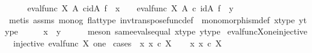 \begin{isabellebody}
\ \ \isamarkupfalse%
\ \isamarkupfalse%
\ {\isachardoublequoteopen}eval{\isacharunderscore}{\kern0pt}func\ X\ A\ {\isasymcirc}\isactrlsub c{\isacharparenleft}{\kern0pt}id{\isacharparenleft}{\kern0pt}A{\isacharparenright}{\kern0pt}\ {\isasymtimes}\isactrlsub f\ \ x{\isacharparenright}{\kern0pt}\ {\isacharequal}{\kern0pt}\ \ \ eval{\isacharunderscore}{\kern0pt}func\ X\ A\ {\isasymcirc}\isactrlsub c\ {\isacharparenleft}{\kern0pt}id{\isacharparenleft}{\kern0pt}A{\isacharparenright}{\kern0pt}\ {\isasymtimes}\isactrlsub f\ \ y{\isacharparenright}{\kern0pt}{\isachardoublequoteclose}\ \ \isanewline
\ \ \ \ \isamarkupfalse%
\ {\isacharparenleft}{\kern0pt}metis\ assms{\isacharparenleft}{\kern0pt}{}{\isacharparenright}{\kern0pt}\ mono{\isacharunderscore}{\kern0pt}g\ flat{\isacharunderscore}{\kern0pt}type\ inv{\isacharunderscore}{\kern0pt}transpose{\isacharunderscore}{\kern0pt}func{\isacharunderscore}{\kern0pt}def{}\ \ monomorphism{\isacharunderscore}{\kern0pt}def{}\ x{\isacharunderscore}{\kern0pt}type{\isacharprime}{\kern0pt}\ y{\isacharunderscore}{\kern0pt}type{\isacharprime}{\kern0pt}{\isacharparenright}{\kern0pt}\isanewline
\ \ \isamarkupfalse%
\ \isamarkupfalse%
\ {\isachardoublequoteopen}x\ {\isacharequal}{\kern0pt}\ y{\isachardoublequoteclose}\isanewline
\ \ \ \ \isamarkupfalse%
\ {\isacharparenleft}{\kern0pt}meson\ same{\isacharunderscore}{\kern0pt}evals{\isacharunderscore}{\kern0pt}equal\ x{\isacharunderscore}{\kern0pt}type{\isacharprime}{\kern0pt}\ y{\isacharunderscore}{\kern0pt}type{\isacharprime}{\kern0pt}{\isacharparenright}{\kern0pt}\isanewline
{}\isamarkupfalse%
%
\endisatagproof
{\isafoldproof}%
%
\isadelimproof
\isanewline
%
\endisadelimproof
\isanewline
{}\isamarkupfalse%
\ eval{\isacharunderscore}{\kern0pt}func{\isacharunderscore}{\kern0pt}X{\isacharunderscore}{\kern0pt}one{\isacharunderscore}{\kern0pt}injective{\isacharcolon}{\kern0pt}\isanewline
\ \ {\isachardoublequoteopen}injective\ {\isacharparenleft}{\kern0pt}eval{\isacharunderscore}{\kern0pt}func\ X\ one{\isacharparenright}{\kern0pt}{\isachardoublequoteclose}\isanewline
%
\isadelimproof
%
\endisadelimproof
%
\isatagproof
{}\isamarkupfalse%
\ {\isacharparenleft}{\kern0pt}cases\ {\isachardoublequoteopen}{\isasymexists}\ x{\isachardot}{\kern0pt}\ x\ {\isasymin}\isactrlsub c\ X{\isachardoublequoteclose}{\isacharparenright}{\kern0pt}\isanewline
\ \ \isamarkupfalse%
\ {\isachardoublequoteopen}{\isasymexists}x{\isachardot}{\kern0pt}\ x\ {\isasymin}\isactrlsub c\ X{\isachardoublequoteclose}\isanewline

\end{isabellebody}
